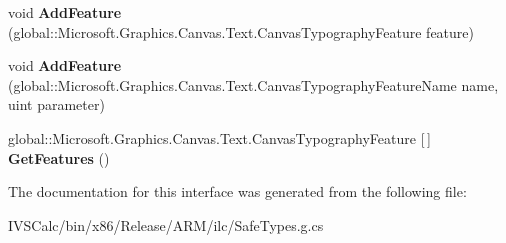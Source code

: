 \begin{DoxyCompactItemize}
\item 
\mbox{\label{interface_microsoft_1_1_graphics_1_1_canvas_1_1_text_1_1_i_canvas_typography_a411e4a2a41c0157396db12ec2acab31d}} 
void {\bfseries Add\+Feature} (global\+::\+Microsoft.\+Graphics.\+Canvas.\+Text.\+Canvas\+Typography\+Feature feature)
\item 
\mbox{\label{interface_microsoft_1_1_graphics_1_1_canvas_1_1_text_1_1_i_canvas_typography_a2c8dc7baaa1737f81e1d72911b2e12ab}} 
void {\bfseries Add\+Feature} (global\+::\+Microsoft.\+Graphics.\+Canvas.\+Text.\+Canvas\+Typography\+Feature\+Name name, uint parameter)
\item 
\mbox{\label{interface_microsoft_1_1_graphics_1_1_canvas_1_1_text_1_1_i_canvas_typography_af297984550baf8fc4cbe7241965025ca}} 
global\+::\+Microsoft.\+Graphics.\+Canvas.\+Text.\+Canvas\+Typography\+Feature \mbox{[}$\,$\mbox{]} {\bfseries Get\+Features} ()
\end{DoxyCompactItemize}


The documentation for this interface was generated from the following file\+:\begin{DoxyCompactItemize}
\item 
I\+V\+S\+Calc/bin/x86/\+Release/\+A\+R\+M/ilc/Safe\+Types.\+g.\+cs\end{DoxyCompactItemize}
